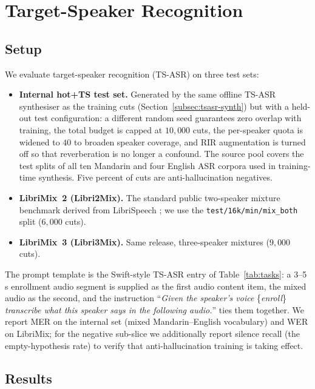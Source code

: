 \section{Target-Speaker Recognition}
\label{sec:tsasr}

\subsection{Setup}

We evaluate target-speaker recognition (TS-ASR) on three test sets:

\begin{itemize}
  \item \textbf{Internal hot+TS test set.} Generated by the same
        offline TS-ASR synthesiser as the training cuts
        (Section~\ref{subsec:tsasr-synth}) but with a held-out test
        configuration: a different random seed guarantees zero overlap
        with training, the total budget is capped at $10{,}000$ cuts,
        the per-speaker quota is widened to $40$ to broaden speaker
        coverage, and RIR augmentation is turned off so that
        reverberation is no longer a confound. The source pool covers
        the test splits of all ten Mandarin and four English ASR
        corpora used in training-time synthesis. Five percent of cuts
        are anti-hallucination negatives.
  \item \textbf{LibriMix~2 (Libri2Mix).} The standard public
        two-speaker mixture benchmark derived from LibriSpeech
        \cite{cosentino2020librimix}; we use the
        \texttt{test/16k/min/mix\_both} split ($6{,}000$ cuts).
  \item \textbf{LibriMix~3 (Libri3Mix).} Same release, three-speaker
        mixtures ($9{,}000$ cuts).
\end{itemize}

The prompt template is the Swift-style TS-ASR entry of
Table~\ref{tab:tasks}: a 3--5\,s enrollment audio segment is supplied
as the first audio content item, the mixed audio as the second, and
the instruction ``\textit{Given the speaker's voice} \{\textit{enroll}\}
\textit{transcribe what this speaker says in the following audio.}''
ties them together. We report MER on the internal set (mixed
Mandarin--English vocabulary) and WER on LibriMix; for the negative
sub-slice we additionally report silence recall (the empty-hypothesis
rate) to verify that anti-hallucination training is taking effect.

\subsection{Results}


